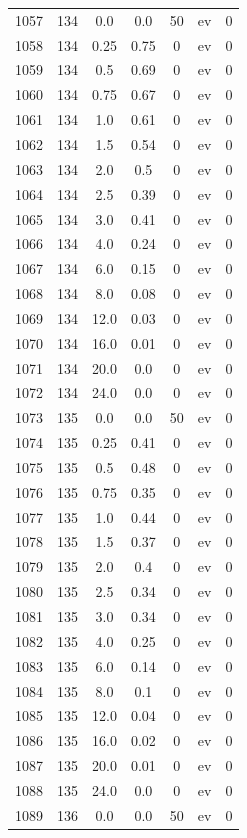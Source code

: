 \documentclass[12pt,a4paper]{article}
\begin{document}
\begin{tabular}{r|cccccc}
	1057 & 134 & 0.0 & 0.0 & 50 & ev & 0 \\
	1058 & 134 & 0.25 & 0.75 & 0 & ev & 0 \\
	1059 & 134 & 0.5 & 0.69 & 0 & ev & 0 \\
	1060 & 134 & 0.75 & 0.67 & 0 & ev & 0 \\
	1061 & 134 & 1.0 & 0.61 & 0 & ev & 0 \\
	1062 & 134 & 1.5 & 0.54 & 0 & ev & 0 \\
	1063 & 134 & 2.0 & 0.5 & 0 & ev & 0 \\
	1064 & 134 & 2.5 & 0.39 & 0 & ev & 0 \\
	1065 & 134 & 3.0 & 0.41 & 0 & ev & 0 \\
	1066 & 134 & 4.0 & 0.24 & 0 & ev & 0 \\
	1067 & 134 & 6.0 & 0.15 & 0 & ev & 0 \\
	1068 & 134 & 8.0 & 0.08 & 0 & ev & 0 \\
	1069 & 134 & 12.0 & 0.03 & 0 & ev & 0 \\
	1070 & 134 & 16.0 & 0.01 & 0 & ev & 0 \\
	1071 & 134 & 20.0 & 0.0 & 0 & ev & 0 \\
	1072 & 134 & 24.0 & 0.0 & 0 & ev & 0 \\
	1073 & 135 & 0.0 & 0.0 & 50 & ev & 0 \\
	1074 & 135 & 0.25 & 0.41 & 0 & ev & 0 \\
	1075 & 135 & 0.5 & 0.48 & 0 & ev & 0 \\
	1076 & 135 & 0.75 & 0.35 & 0 & ev & 0 \\
	1077 & 135 & 1.0 & 0.44 & 0 & ev & 0 \\
	1078 & 135 & 1.5 & 0.37 & 0 & ev & 0 \\
	1079 & 135 & 2.0 & 0.4 & 0 & ev & 0 \\
	1080 & 135 & 2.5 & 0.34 & 0 & ev & 0 \\
	1081 & 135 & 3.0 & 0.34 & 0 & ev & 0 \\
	1082 & 135 & 4.0 & 0.25 & 0 & ev & 0 \\
	1083 & 135 & 6.0 & 0.14 & 0 & ev & 0 \\
	1084 & 135 & 8.0 & 0.1 & 0 & ev & 0 \\
	1085 & 135 & 12.0 & 0.04 & 0 & ev & 0 \\
	1086 & 135 & 16.0 & 0.02 & 0 & ev & 0 \\
	1087 & 135 & 20.0 & 0.01 & 0 & ev & 0 \\
	1088 & 135 & 24.0 & 0.0 & 0 & ev & 0 \\
	1089 & 136 & 0.0 & 0.0 & 50 & ev & 0 \\

\end{tabular}
\end{document}
